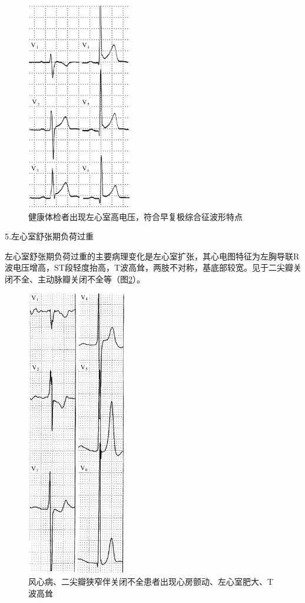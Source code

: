 \begin{figure}[!htbp]
 \centering
 \includegraphics[width=1.79167in,height=3.60417in]{./images/Image00101.jpg}
 \captionsetup{justification=centering}
 \caption{健康体检者出现左心室高电压，符合早复极综合征波形特点}
 \label{fig6-9}
  \end{figure} 

5.左心室舒张期负荷过重

左心室舒张期负荷过重的主要病理变化是左心室扩张，其心电图特征为左胸导联R波电压增高，ST段轻度抬高，T波高耸，两肢不对称，基底部较宽。见于二尖瓣关闭不全、主动脉瓣关闭不全等（图\ref{fig6-10}）。

\begin{figure}[!htbp]
 \centering
 \includegraphics[width=1.70833in,height=4.95833in]{./images/Image00102.jpg}
 \captionsetup{justification=centering}
 \caption{风心病、二尖瓣狭窄伴关闭不全患者出现心房颤动、左心室肥大、T波高耸}
 \label{fig6-10}
  \end{figure} 

